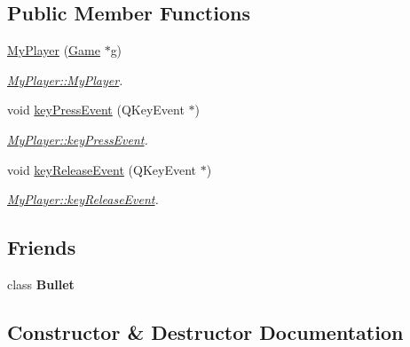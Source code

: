 \subsection*{Public Member Functions}
\begin{DoxyCompactItemize}
\item 
\hyperlink{class_my_player_a43316e7e70cd8f196f6031f987068d20}{My\+Player} (\hyperlink{class_game}{Game} $\ast$g)
\begin{DoxyCompactList}\small\item\em \hyperlink{class_my_player_a43316e7e70cd8f196f6031f987068d20}{My\+Player\+::\+My\+Player}. \end{DoxyCompactList}\item 
void \hyperlink{class_my_player_aba7afb69ba4dc7679c91bc204f8a5543}{key\+Press\+Event} (Q\+Key\+Event $\ast$)
\begin{DoxyCompactList}\small\item\em \hyperlink{class_my_player_aba7afb69ba4dc7679c91bc204f8a5543}{My\+Player\+::key\+Press\+Event}. \end{DoxyCompactList}\item 
void \hyperlink{class_my_player_a72361f5f9b601a37e3cda0207657d2e9}{key\+Release\+Event} (Q\+Key\+Event $\ast$)
\begin{DoxyCompactList}\small\item\em \hyperlink{class_my_player_a72361f5f9b601a37e3cda0207657d2e9}{My\+Player\+::key\+Release\+Event}. \end{DoxyCompactList}\end{DoxyCompactItemize}
\subsection*{Friends}
\begin{DoxyCompactItemize}
\item 
\hypertarget{class_my_player_a24819047809c73786cf241ae7546a7cd}{}class {\bfseries Bullet}\label{class_my_player_a24819047809c73786cf241ae7546a7cd}

\end{DoxyCompactItemize}


\subsection{Constructor \& Destructor Documentation}
\hypertarget{class_my_player_a43316e7e70cd8f196f6031f987068d20}{}
